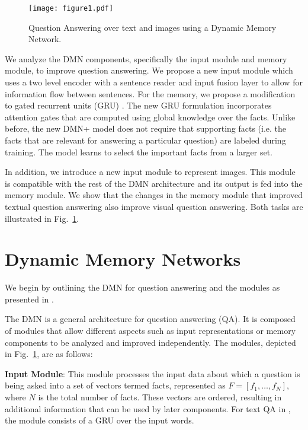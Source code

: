 \documentclass{article}
\begin{document}
\begin{figure}[t]
\centering
\texttt{[image: figure1.pdf]}
\vspace{-0.3cm}
\caption{Question Answering over text and images using a Dynamic Memory Network.}
\vspace{-0.6cm}
\label{fig:fig1}
\end{figure}

We analyze the DMN components, specifically the input module and memory module, to improve question answering.
We propose a new input module which uses a two level encoder with a sentence reader and input fusion layer to allow for information flow between sentences. 
For the memory, we propose a modification to gated recurrent units (GRU) \cite{Chung2014}. The new GRU formulation incorporates attention gates  that are computed using global knowledge over the facts.
Unlike before, the new DMN+ model does not require that supporting facts (i.e. the facts that are relevant for answering a particular question) are labeled during training. The model learns to select the important facts from a larger set.

In addition, we introduce a new input module to represent images. This module is compatible with the rest of the DMN architecture and its output is fed into the memory module. We show that the changes in the memory module that improved textual question answering also improve visual question answering. Both tasks are illustrated in Fig.~\ref{fig:fig1}. 


\section{Dynamic Memory Networks}
We begin by outlining the DMN for question answering and the modules as presented in \citet{Kumar2015}. 

The DMN is a general architecture for question answering (QA). It is composed of modules that allow different aspects such as input representations or memory components to be analyzed and improved independently. 
The modules, depicted in Fig.~\ref{fig:fig1}, are as follows:

\textbf{Input Module}:
This module processes the input data about which a question is being asked into a set of vectors termed facts, represented as $F=[f_1,\hdots,f_N]$, where $N$ is the total number of facts.
These vectors are ordered, resulting in additional information that can be used by later components.
For text QA in \citet{Kumar2015}, the module consists of a GRU over the input words.
\end{document}
